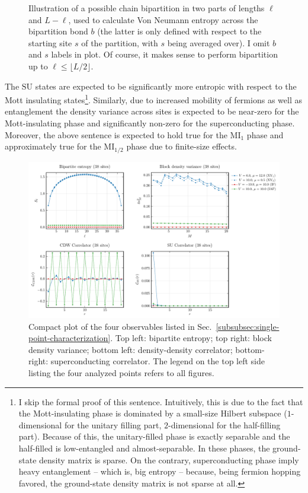 \begin{figure}
	\centering
	
	\caption{Illustration of a possible chain bipartition in two parts of lengths $\ell$ and $L-\ell$, used to calculate Von Neumann entropy across the bipartition bond $b$ (the latter is only defined with respect to the starting site $s$ of the partition, with $s$ being averaged over). I omit $b$ and $s$ labels in plot. Of course, it makes sense to perform bipartition up to $\ell \le \lfloor L/2 \rfloor$.}
	\label{fig:bipartition-illustration}
\end{figure}

\noindent The $\mathrm{SU}$ states are expected to be significantly more entropic with respect to the Mott insulating states\footnote{
	I skip the formal proof of this sentence. Intuitively, this is due to the fact that the Mott-insulating phase is dominated by a small-size Hilbert subspace ($1$-dimensional for the unitary filling part, $2$-dimensional for the half-filling part). Because of this, the unitary-filled phase is exactly separable and the half-filled is low-entangled and almost-separable. In these phases, the ground-state density matrix is sparse. On the contrary, superconducting phase imply heavy entanglement -- which is, big entropy -- because, being fermion hopping favored, the ground-state density matrix is not sparse at all.
}. Similarly, due to increased mobility of fermions as well as entanglement the density variance across sites is expected to be near-zero for the Mott-insulating phase and significantly non-zero for the superconducting phase. Moreover, the above sentence is expected to hold true for the $\mathrm{MI}_1$ phase and approximately true for the $\mathrm{MI}_{1/2}$ phase due to finite-size effects.

\begin{figure}
	\centering
	\includegraphics[width=\textwidth]{../Project/analysis/states-properties/compact-plot_L=38.pdf}
	\caption{Compact plot of the four observables listed in Sec.~\ref{subsubsec:single-point-characterization}. Top left: bipartite entropy; top right: block density variance; bottom left: density-density correlator; bottom-right: superconducting correlator. The legend on the top left side listing the four analyzed points refers to all figures.}
	\label{fig:compact-plot}
\end{figure}

